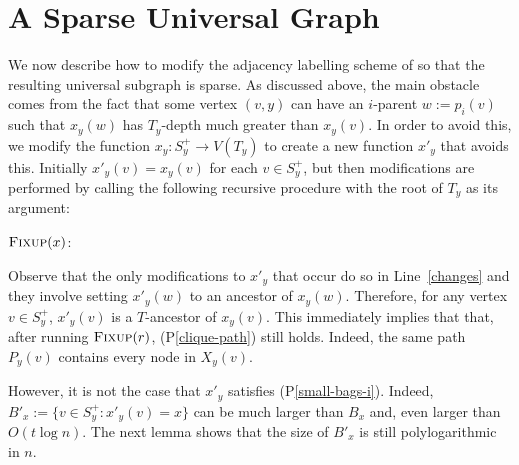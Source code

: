 \documentclass{patmorin}
\newcommand{\pref}[1]{(P\ref{#1})}
\begin{document}
\section{A Sparse Universal Graph}

We now describe how to modify the adjacency labelling scheme of \citet{dujmovic.esperet.ea:adjacency} so that the resulting universal subgraph is sparse.  As discussed above, the main obstacle comes from the fact that some vertex $(v,y)$ can have an $i$-parent $w:=p_i(v)$ such that $x_y(w)$ has $T_y$-depth much greater than $x_y(v)$.  In order to avoid this, we modify the function $x_y:S^+_y\to V(T_y)$ to create a new function $x'_y$ that avoids this. Initially $x'_y(v)=x_y(v)$ for each $v\in S^+_y$, but then modifications are performed by calling the following recursive procedure with the root of $T_y$ as its argument:

\noindent
\begin{minipage}{\textwidth}
    $\textsc{Fixup}(x)$:
    \begin{algorithmic}[1]
                \ENDIF
            \ENDFOR
        \ENDFOR
    \end{algorithmic}
\end{minipage}


Observe that the only modifications to $x'_y$ that occur do so in Line~\ref{changes} and they involve setting $x'_y(w)$ to an ancestor of $x_y(w)$.  Therefore, for any vertex $v\in S^+_y$, $x'_y(v)$ is a $T$-ancestor of $x_y(v)$.  This immediately implies that that, after running $\textsc{Fixup}(r)$, \pref{clique-path} still holds. Indeed, the same path $P_y(v)$ contains every node in $X_y(v)$.

However, it is not the case that $x'_y$ satisfies \pref{small-bags-i}.  Indeed, $B'_x:=\{v\in S^+_y: x'_y(v)=x\}$ can be much larger than $B_x$ and, even larger than $O(t\log n)$.  The next lemma shows that the size of $B'_x$ is still polylogarithmic in $n$.
\end{document}
